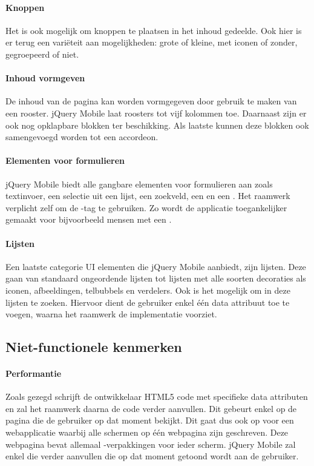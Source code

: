 \paragraph{Knoppen}
Het is ook mogelijk om knoppen te plaatsen in het inhoud gedeelde. 
Ook hier is er terug een variëteit aan mogelijkheden: grote of kleine, met iconen of zonder, gegroepeerd of niet. 

\paragraph{Inhoud vormgeven}
De inhoud van de pagina kan worden vormgegeven door gebruik te maken van een rooster. 
jQuery Mobile laat roosters tot vijf kolommen toe. Daarnaast zijn er ook nog opklapbare blokken ter beschikking. 
Als laatste kunnen deze blokken ook samengevoegd worden tot een accordeon. 

\paragraph{Elementen voor formulieren}
jQuery Mobile biedt alle gangbare elementen voor formulieren aan zoals textinvoer, een selectie uit een lijst, een zoekveld, een  en een . 
Het raamwerk verplicht zelf om de -tag te gebruiken. 
Zo wordt de applicatie toegankelijker gemaakt voor bijvoorbeeld mensen met een .

\paragraph{Lijsten}
Een laatste categorie UI elementen die jQuery Mobile aanbiedt, zijn lijsten. 
Deze gaan van standaard ongeordende lijsten tot lijsten met alle soorten decoraties als iconen, afbeeldingen, telbubbels en verdelers. 
Ook is het mogelijk om in deze lijsten te zoeken. 
Hiervoor dient de gebruiker enkel één data attribuut toe te voegen, waarna het raamwerk de implementatie voorziet. 

\subsection{Niet-functionele kenmerken}
\paragraph{Performantie}
Zoals gezegd schrijft de ontwikkelaar HTML5 code met specifieke data attributen en zal het raamwerk daarna de code verder aanvullen. 
Dit gebeurt enkel op de pagina die de gebruiker op dat moment bekijkt. 
Dit gaat dus ook op voor een webapplicatie waarbij alle schermen op één webpagina zijn geschreven. 
Deze webpagina bevat allemaal -verpakkingen voor ieder scherm. 
jQuery Mobile zal enkel die  verder aanvullen die op dat moment getoond wordt aan de gebruiker. 

